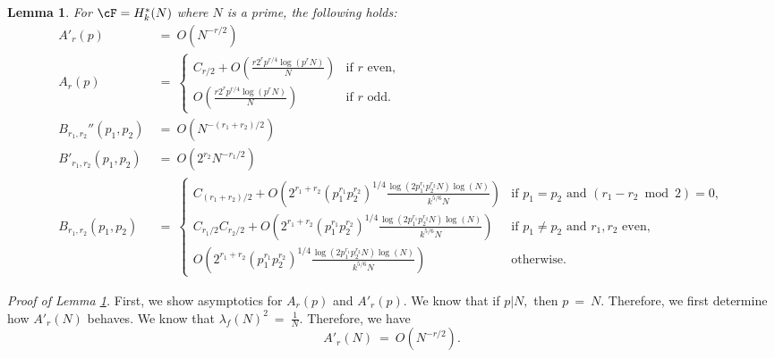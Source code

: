 \documentclass[11pt, reqno]{amsart}
\newtheorem{lemma}[theorem]{Lemma}
\theoremstyle{definition}
\theoremstyle{remark}
\numberwithin{equation}{section}
\begin{document}
\begin{lemma}\label{thm: N prime, weight term values}
    For $\cF= H_k^*(N)$ where $N$ is a prime, the following holds:
    \footnotesize \begin{align*}
A'_r(p)\ &=\ O(N^{-r/2}) \\[6pt]
A_r(p)\ &= \
\begin{cases}
  C_{r/2} + O\!\left(\frac{r 2^r p^{r/4}\log(p^rN)}{N}\right) 
    & \text{if $r$ even}, \\
  O\!\left(\frac{r 2^r p^{r/4}\log(p^rN)}{N}\right) 
    & \text{if $r$ odd}.
\end{cases} \\[10pt]
B_{r_1,r_2}''(p_1,p_2)\ &=\ O\!\left(N^{-(r_1+r_2)/2}\right) \\[6pt]
B'_{r_1,r_2}(p_1,p_2)\  &=\ O\!\left(2^{r_2}N^{-r_1/2}\right) \\[6pt]
B_{r_1,r_2}(p_1,p_2)\ &=\
\begin{cases}
  C_{(r_1+r_2)/2} 
    + O\!\left(2^{r_1+r_2}(p_1^{r_1}p_2^{r_2})^{1/4}
    \frac{\log(2p_1^{r_1}p_2^{r_2}N)\log(N)}{k^{5/6}N}\right) 
    & \text{if $p_1 = p_2$ and $(r_1-r_2 \bmod 2)=0$}, \\[6pt]
  C_{r_1/2}C_{r_2/2} 
    + O\!\left(2^{r_1+r_2}(p_1^{r_1}p_2^{r_2})^{1/4}
    \frac{\log(2p_1^{r_1}p_2^{r_2}N)\log(N)}{k^{5/6}N}\right) 
    & \text{if $p_1 \neq p_2$ and $r_1,r_2$ even}, \\[6pt]
  O\!\left(2^{r_1+r_2}(p_1^{r_1}p_2^{r_2})^{1/4}
    \frac{\log(2p_1^{r_1}p_2^{r_2}N)\log(N)}{k^{5/6}N}\right) 
    & \text{otherwise}.
\end{cases}
\end{align*}\normalsize
\end{lemma}
\noindent\textit{Proof of Lemma \ref{thm: N prime, weight term values}.} First, we show asymptotics for $A_r(p)$ and $A'_r(p).$  We know that if $p| N,$ then $p\ =\ N.$ Therefore, we first determine how $A'_r(N)$ behaves. We know that $\lambda_f(N)^2 \ =\ \frac{1}{N}. $ Therefore, we have 
\begin{equation}
    A'_r(N) \ = \ O(N^{-r/2}).
\end{equation}
\end{document}

